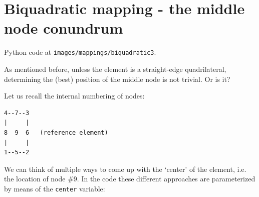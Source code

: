 \section{Biquadratic mapping - the middle node conundrum}

Python code at {\tt images/mappings/biquadratic3}.

As mentioned before, unless the element is a straight-edge quadrilateral, 
determining the (best) position of the middle node is not trivial. Or is it?

Let us recall the internal numbering of nodes:
\begin{verbatim}
4--7--3
|     |
8  9  6   (reference element)
|     |
1--5--2
\end{verbatim}


We can think of multiple ways to come up with the `center' of the element, 
i.e. the location of node \#9. %
In the code these different approaches are parameterized by means of the
\lstinline{center} variable:

